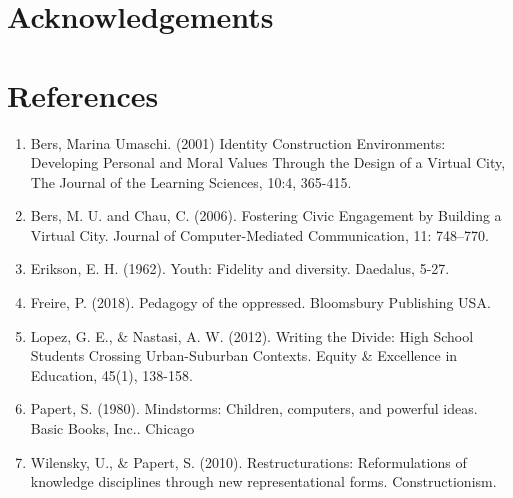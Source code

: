 \documentclass{sigchi-ext}
\begin{document}
\section{Acknowledgements}


\section{References}
\begin{enumerate}
\item Bers, Marina Umaschi. (2001) Identity Construction Environments: Developing Personal and Moral Values Through the Design of a Virtual City, The Journal of the Learning Sciences, 10:4, 365-415.

\item Bers, M. U. and Chau, C. (2006). Fostering Civic Engagement by Building a Virtual City. Journal of Computer-Mediated Communication, 11: 748–770.

\item Erikson, E. H. (1962). Youth: Fidelity and diversity. Daedalus, 5-27.

\item Freire, P. (2018). Pedagogy of the oppressed. Bloomsbury Publishing USA.

\item Lopez, G. E., \& Nastasi, A. W. (2012). Writing the Divide: High School Students Crossing Urban-Suburban Contexts. Equity \& Excellence in Education, 45(1), 138-158.	

\item Papert, S. (1980). Mindstorms: Children, computers, and powerful ideas. Basic Books, Inc.. Chicago

\item Wilensky, U., \& Papert, S. (2010). Restructurations: Reformulations of knowledge disciplines through new representational forms. Constructionism.
\end{enumerate}




%
%
\end{document}
